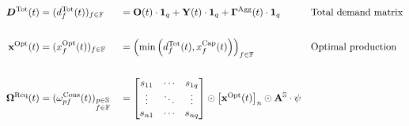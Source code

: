 { \small
  \begin{alignat*}{4}
    \bm{D}^{\textrm{Tot}}(t) &= (d_{f}^{\textrm{Tot}}(t))_{f \in \firmsset} &&=
                                                                               \ioorders(t)
                                                                               \cdot
                                                                               \irowsum{q}
                                                                               +
                                                                               \ioy(t)
                                                                               \cdot
                                                                               \irowsum{q}
                                                                               +
                                                                               \Damage^{\textrm{Agg}}(t)
    \cdot \irowsum{q} && \text{Total demand matrix} \\
                                 & && &&\\
    \iox^{\textrm{Opt}}(t) &= (x^{\textrm{Opt}}_{f}(t))_{f \in \firmsset} &&= \left ( \min \left ( d^{\textrm{Tot}}_{f}(t), x^{\textrm{Cap}}_{f}(t) \right ) \right )_{f \in \firmsset} && \text{Optimal production}\\
                                 & && &&\\
    \ioinv^{\textrm{Req}}(t) &= (\omega^{\textrm{Cons}}_{pf}(t))_{\substack{p \in \sectorsset\\f \in \firmsset}} &&=
                                                                                                                  \begin{bmatrix}
                                                                                                                    s_{11} & \cdots & s_{1q} \\
                                                                                                                    \vdots & \ddots & \vdots\\
                                                                                                                    s_{n1} & \cdots & s_{nq}
                                                                                                                  \end{bmatrix}
                                                                                                                  \odot \begin{bmatrix} \iox^{\textrm{Opt}}(t) \end{bmatrix}_{n} \odot \ioa^{\sectorsset} \cdot \psi &                                    & \\

\end{alignat*}}
